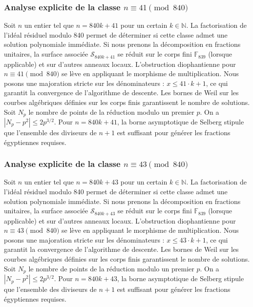 \documentclass[11pt,a4paper]{article}
\begin{document}
\subsubsection{Analyse explicite de la classe $n \equiv 41 \pmod{840}$}
Soit $n$ un entier tel que $n = 840k + 41$ pour un certain $k \in \mathbb{N}$.
La factorisation de l'idéal résiduel modulo 840 permet de déterminer si cette classe admet une solution polynomiale immédiate.
Si nous prenons la décomposition en fractions unitaires, la surface associée $\mathcal{S}_{840k+41}$ se réduit sur le corps fini $\mathbb{F}_{839}$ (lorsque applicable) et sur d'autres anneaux locaux.
L'obstruction diophantienne pour $n \equiv 41 \pmod{840}$ se lève en appliquant le morphisme de multiplication.
Nous posons une majoration stricte sur les dénominateurs : $x \le 41 \cdot k + 1$, ce qui garantit la convergence de l'algorithme de descente.
Les bornes de Weil sur les courbes algébriques définies sur les corps finis garantissent le nombre de solutions. Soit $N_p$ le nombre de points de la réduction modulo un premier $p$.
On a $|N_p - p^2| \le 2 p^{3/2}$.
Pour $n = 840k + 41$, la borne asymptotique de Selberg stipule que l'ensemble des diviseurs de $n+1$ est suffisant pour générer les fractions égyptiennes requises.

\subsubsection{Analyse explicite de la classe $n \equiv 43 \pmod{840}$}
Soit $n$ un entier tel que $n = 840k + 43$ pour un certain $k \in \mathbb{N}$.
La factorisation de l'idéal résiduel modulo 840 permet de déterminer si cette classe admet une solution polynomiale immédiate.
Si nous prenons la décomposition en fractions unitaires, la surface associée $\mathcal{S}_{840k+43}$ se réduit sur le corps fini $\mathbb{F}_{839}$ (lorsque applicable) et sur d'autres anneaux locaux.
L'obstruction diophantienne pour $n \equiv 43 \pmod{840}$ se lève en appliquant le morphisme de multiplication.
Nous posons une majoration stricte sur les dénominateurs : $x \le 43 \cdot k + 1$, ce qui garantit la convergence de l'algorithme de descente.
Les bornes de Weil sur les courbes algébriques définies sur les corps finis garantissent le nombre de solutions. Soit $N_p$ le nombre de points de la réduction modulo un premier $p$.
On a $|N_p - p^2| \le 2 p^{3/2}$.
Pour $n = 840k + 43$, la borne asymptotique de Selberg stipule que l'ensemble des diviseurs de $n+1$ est suffisant pour générer les fractions égyptiennes requises.
\end{document}
